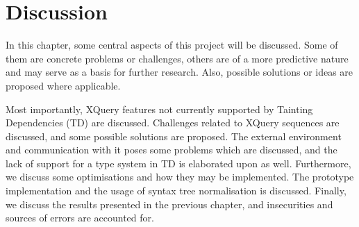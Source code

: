 \chapter{Discussion}
\label{chapter:discussion}
In this chapter, some central aspects of this project will be discussed. Some
of them are concrete problems or challenges, others are of a more predictive
nature and may serve as a basis for further research. Also, possible
solutions or ideas are proposed where applicable. 

Most importantly, XQuery features not currently supported by Tainting
Dependencies (TD) are discussed. Challenges related to XQuery sequences are
discussed, and some possible solutions are proposed. The external environment
and communication with it poses some problems which are discussed, and the
lack of support for a type system in TD is elaborated upon as well.
Furthermore, we discuss some optimisations and how they may be implemented.
The prototype implementation and the usage of syntax tree normalisation is
discussed. Finally, we discuss the results presented in the previous chapter,
and insecurities and sources of errors are accounted for.








